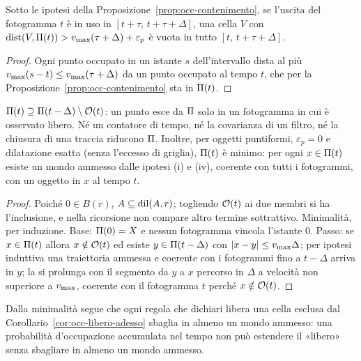 \begin{corollario}\label{cor:occ-libero-adesso}
Sotto le ipotesi della Proposizione~\ref{prop:occ-contenimento}, se l'uscita del fotogramma $t$ è in uso in $[t+\tau,\,t+\tau+\Delta]$, una cella $V$ con $\operatorname{dist}(V,\Pi(t))>v_{\max}(\tau+\Delta)+\varepsilon_p$ è vuota in tutto $[t,\,t+\tau+\Delta]$. 
\end{corollario}
\begin{proof}
Ogni punto occupato in un istante $s$ dell'intervallo dista al più $v_{\max}(s-t)\le v_{\max}(\tau+\Delta)$ da un punto occupato al tempo $t$, che per la Proposizione~\ref{prop:occ-contenimento} sta in $\Pi(t)$.
\end{proof}

\begin{proposizione}\label{prop:occ-monotonia}
$\Pi(t)\supseteq\Pi(t-\Delta)\setminus\mathcal{O}(t)$: un punto esce da $\Pi$ solo in un fotogramma in cui è osservato libero. Né un contatore di tempo, né la covarianza di un filtro, né la chiusura di una traccia riducono $\Pi$. Inoltre, per oggetti puntiformi, $\varepsilon_p=0$ e dilatazione esatta (senza l'eccesso di griglia), $\Pi(t)$ è minimo: per ogni $x\in\Pi(t)$ esiste un mondo ammesso dalle ipotesi (i) e (iv), coerente con tutti i fotogrammi, con un oggetto in $x$ al tempo $t$. 
\end{proposizione}
\begin{proof}
Poiché $0\in B(r)$, $A\subseteq\operatorname{dil}(A,r)$; togliendo $\mathcal{O}(t)$ ai due membri si ha l'inclusione, e nella ricorsione non compare altro termine sottrattivo. Minimalità, per induzione. Base: $\Pi(0)=X$ e nessun fotogramma vincola l'istante 0. Passo: se $x\in\Pi(t)$ allora $x\notin\mathcal{O}(t)$ ed esiste $y\in\Pi(t-\Delta)$ con $|x-y|\le v_{\max}\Delta$; per ipotesi induttiva una traiettoria ammessa e coerente con i fotogrammi fino a $t-\Delta$ arriva in $y$; la si prolunga con il segmento da $y$ a $x$ percorso in $\Delta$ a velocità non superiore a $v_{\max}$, coerente con il fotogramma $t$ perché $x\notin\mathcal{O}(t)$.
\end{proof}

Dalla minimalità segue che ogni regola che dichiari libera una cella esclusa dal Corollario~\ref{cor:occ-libero-adesso} sbaglia in almeno un mondo ammesso: una probabilità d'occupazione accumulata nel tempo non può estendere il «libero» senza sbagliare in almeno un mondo ammesso.

